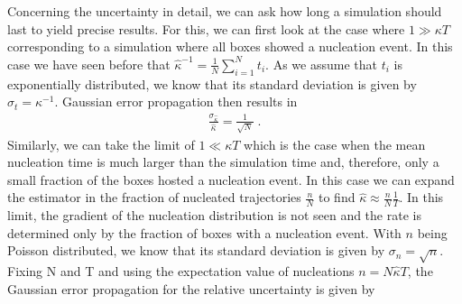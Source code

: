 Concerning the uncertainty in detail, we can ask how long a simulation should last to yield precise results. For this, we can first look at the case where $1 \gg \kappa T$ corresponding to a simulation where all boxes showed a nucleation event. In this case we have seen before that $\hat{\kappa}^{-1} = \frac{1}{N} \sum_{i=1}^N t_i$. As we assume that $t_i$ is exponentially distributed, we know that its standard deviation is given by $\sigma_{t} = \kappa^{-1}$. Gaussian error propagation then results in
\begin{align}
\label{eqn:uncertainty_k_gg}
\frac{\sigma_{\hat{\kappa}}}{\hat{\kappa}} = \frac{1}{\sqrt{N}} \; \text{.}
\end{align}
Similarly, we can take the limit of $1 \ll \kappa T$ which is the case when the mean nucleation time is much larger than the simulation time and, therefore, only a small fraction of the boxes hosted a nucleation event. In this case we can expand the estimator in the fraction of nucleated trajectories $\frac{n}{N}$ to find $\hat{\kappa} \approx \frac{n}{N} \frac{1}{T}$. In this limit, the gradient of the nucleation distribution is not seen and the rate is determined only by the fraction of boxes with a nucleation event. With $n$ being Poisson distributed, we know that its standard deviation is given by $\sigma_n = \sqrt{n}$. Fixing N and T and using the expectation value of nucleations $n = N \hat{\kappa} T$, the Gaussian error propagation for the relative uncertainty is given by 
